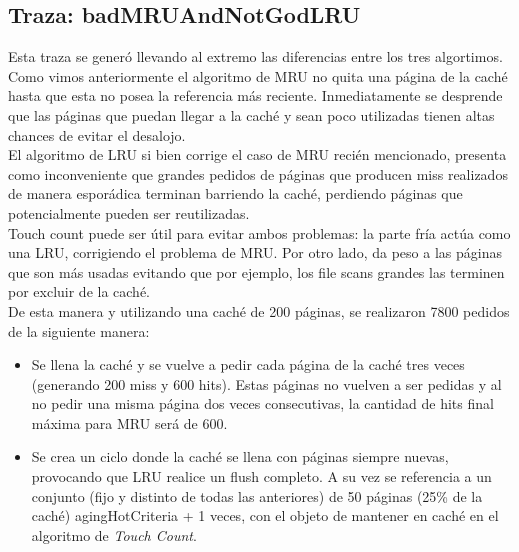 \documentclass[11pt, a4paper, spanish]{article}
\begin{document}
\subsection{Traza: badMRUAndNotGodLRU}

Esta traza se gener\'o llevando al extremo las diferencias entre los tres algortimos.\\

Como vimos anteriormente el algoritmo de MRU no quita una p\'agina de la cach\'e hasta que esta no posea la referencia m\'as reciente. 
Inmediatamente se desprende que las p\'aginas que puedan llegar a la cach\'e y sean poco utilizadas tienen altas chances de evitar el desalojo.\\

El algoritmo de LRU si bien corrige el caso de MRU reci\'en mencionado, presenta como inconveniente que grandes pedidos de p\'aginas que producen
miss realizados de manera espor\'adica terminan barriendo la cach\'e, perdiendo p\'aginas que potencialmente pueden ser reutilizadas.\\

Touch count puede ser \'util para evitar ambos problemas: la parte fr\'ia act\'ua como una LRU, corrigiendo el problema de MRU. Por otro lado, 
da peso a las p\'aginas que son m\'as usadas evitando que por ejemplo, los file scans grandes las terminen por excluir de la cach\'e.\\

De esta manera y utilizando una cach\'e de 200 p\'aginas, se realizaron 7800 pedidos de la siguiente manera:\\

\begin{itemize}
    
	\item{Se llena la cach\'e y se vuelve a pedir cada p\'agina de la cach\'e tres veces (generando 200 miss y 600 hits).
Estas p\'aginas no vuelven a ser pedidas y al no pedir una misma p\'agina dos veces consecutivas, la cantidad de hits final m\'axima para MRU
ser\'a de 600.}\\

    \item{Se crea un ciclo donde la cach\'e se llena con p\'aginas siempre nuevas, provocando que LRU realice un flush completo. 
A su vez se referencia a un conjunto (fijo y distinto de todas las anteriores) de 50 p\'aginas (25\% de la cach\'e) agingHotCriteria + 1 veces, 
con el objeto de mantener en cach\'e en el algoritmo de \textit{Touch Count}.}\\ 

\end{itemize}
\end{document}
